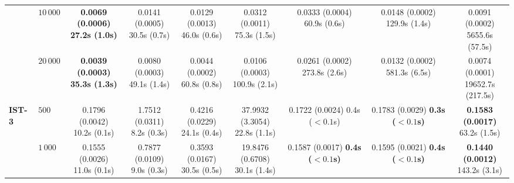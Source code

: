 \begin{table}[htbp]
{\begin{tabular}{llccccccc}
 & $10{\,}000$ & \makecell{\textbf{0.0069 (0.0006)} \\ \scriptsize \textbf{27.2s (1.0s)}} & \makecell{0.0141 (0.0005) \\ \scriptsize 30.5s (0.7s)} & \makecell{0.0129 (0.0013) \\ \scriptsize 46.0s (0.6s)} & \makecell{0.0312 (0.0011) \\ \scriptsize 75.3s (1.5s)} & \makecell{0.0333 (0.0004) \\ \scriptsize 60.9s (0.6s)} & \makecell{0.0148 (0.0002) \\ \scriptsize 129.9s (1.4s)} & \makecell{0.0091 (0.0002) \\ \scriptsize 5655.6s (57.5s)} \\
 & $20{\,}000$ & \makecell{\textbf{0.0039 (0.0003)} \\ \scriptsize \textbf{35.3s (1.3s)}} & \makecell{0.0080 (0.0003) \\ \scriptsize 49.1s (1.4s)} & \makecell{0.0044 (0.0002) \\ \scriptsize 60.8s (0.8s)} & \makecell{0.0106 (0.0003) \\ \scriptsize 100.9s (2.1s)} & \makecell{0.0261 (0.0002) \\ \scriptsize 273.8s (2.6s)} & \makecell{0.0132 (0.0002) \\ \scriptsize 581.3s (6.5s)} & \makecell{0.0074 (0.0001) \\ \scriptsize 19652.7s (217.5s)} \\
\hline
\textbf{IST-3} & $500$ & \makecell{0.1796 (0.0042) \\ \scriptsize 10.2s (0.1s)} & \makecell{1.7512 (0.0311) \\ \scriptsize 8.2s (0.3s)} & \makecell{0.4216 (0.0229) \\ \scriptsize 24.1s (0.4s)} & \makecell{37.9932 (3.3054) \\ \scriptsize 22.8s (1.1s)} & \makecell{0.1722 (0.0024) \\ \scriptsize 0.4s (${<}0.1$s)} & \makecell{0.1783 (0.0029) \\ \scriptsize \textbf{0.3s ($\boldsymbol{{<}0.1}$s)}} & \makecell{\textbf{0.1583 (0.0017)} \\ \scriptsize 63.2s (1.5s)} \\
 & $1{\,}000$ & \makecell{0.1555 (0.0026) \\ \scriptsize 11.0s (0.1s)} & \makecell{0.7877 (0.0109) \\ \scriptsize 9.0s (0.3s)} & \makecell{0.3593 (0.0167) \\ \scriptsize 30.5s (0.5s)} & \makecell{19.8476 (0.6708) \\ \scriptsize 30.1s (1.4s)} & \makecell{0.1587 (0.0017) \\ \scriptsize \textbf{0.4s ($\boldsymbol{{<}0.1}$s)}} & \makecell{0.1595 (0.0021) \\ \scriptsize \textbf{0.4s ($\boldsymbol{{<}0.1}$s)}} & \makecell{\textbf{0.1440 (0.0012)} \\ \scriptsize 143.2s (3.1s)} \\

\end{tabular}}
\end{table}
